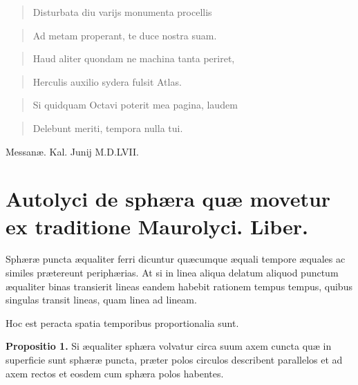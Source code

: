\documentclass[11pt,a4paper]{article}
\begin{document}
\begin{quote}
Disturbata diu varijs monumenta procellis
\end{quote}

\begin{quote}
Ad metam properant, te duce nostra suam.
\end{quote}

\begin{quote}
Haud aliter quondam ne machina tanta periret,
\end{quote}

\begin{quote}
Herculis auxilio sydera fulsit Atlas.
\end{quote}

\begin{quote}
Si quidquam Octavi poterit mea pagina, laudem
\end{quote}

\begin{quote}
Delebunt meriti, tempora nulla tui.
\end{quote}

Messanæ. Kal. Junij M.D.LVII.


\section*{Autolyci de sphæra quæ movetur ex traditione Maurolyci. Liber.}

Sphæræ puncta æqualiter ferri dicuntur quæcumque æquali
tempore æquales ac similes prætereunt periphærias. At
si in linea aliqua delatum aliquod punctum æqualiter
binas transierit lineas eandem habebit rationem tempus
tempus, quibus singulas transit lineas, quam linea
ad lineam.

Hoc est peracta spatia temporibus proportionalia sunt.

\textbf{Propositio 1.} Si æqualiter sphæra volvatur circa suum axem cuncta
quæ in superficie sunt sphæræ puncta, præter polos
circulos describent parallelos et ad axem rectos et
eosdem cum sphæra polos habentes.
\end{document}
